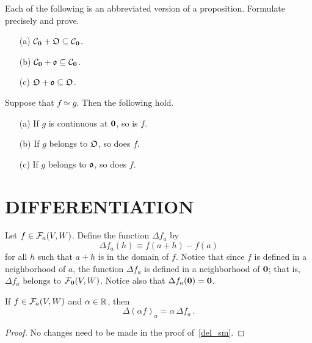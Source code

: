 \begin{prob} Each of the following is an abbreviated version of a proposition.  Formulate precisely
and prove.
 \begin{enumerate}
  \item[(a)] $\mathcal{C}_{\mathbf{0}} + \mathfrak{O} \subseteq \mathcal{C}_{\mathbf{0}}$.
  \item[(b)] $\mathcal{C}_{\mathbf{0}} + \mathfrak{o} \subseteq \mathcal{C}_{\mathbf{0}}$.
  \item[(c)] $\mathfrak{O} + \mathfrak{o} \subseteq \mathfrak{O}$.
 \end{enumerate}
\end{prob}

\begin{prob}  Suppose that $f \simeq g$. Then the following hold.
 \begin{enumerate}
  \item[(a)] If $g$ is continuous at $\mathbf{0}$, so is $f$.
  \item[(b)] If $g$ belongs to $\mathfrak{O}$, so does $f$.
  \item[(c)] If $g$ belongs to $\mathfrak{o}$, so does $f$.
 \end{enumerate}
\end{prob}






\section{DIFFERENTIATION}

\begin{defn}  Let $f \in \mathcal{F}_a(V,W)$. Define the function
$\Delta f_a$ by
  \[ \Delta f_a(h) \equiv f(a+h) - f(a) \]
for all $h$ such that $a + h$ is in the domain of $f$.  Notice that since $f$ is defined in a
neighborhood of $a$, the function $\Delta f_a$ is defined in a neighborhood of $\mathbf{0}$; that
is, $\Delta f_a$ belongs to $\mathcal{F}_{\mathbf{0}}(V,W)$. Notice also that $\Delta f_a(\mathbf{0}) = \mathbf{0}$.
\end{defn}

\begin{prop}\label{prop_del_sm} If $f \in \mathcal{F}_a(V,W)$ and $\alpha \in \mathbb{R}$, then
  \[ \Delta(\alpha f)_a = \alpha\,\Delta f_a\,. \]
\end{prop}

\begin{proof} No changes need to be made in the proof of~\ref{del_sm}.   \end{proof}

